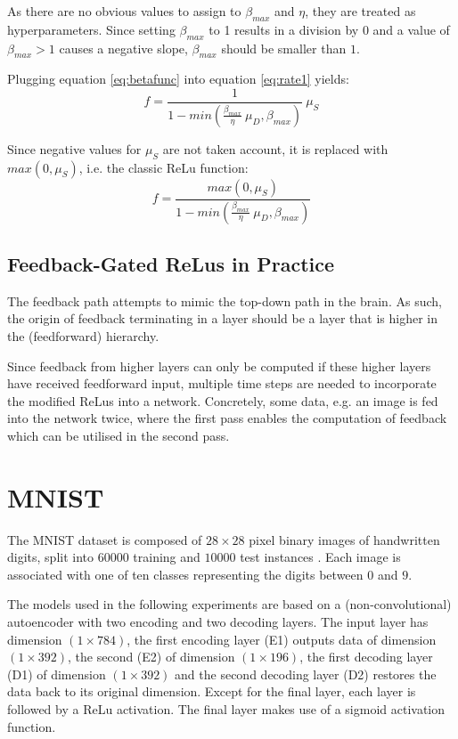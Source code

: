 \documentclass{article}
\begin{document}
As there are no obvious values to assign to $\beta_{max}$ and $\eta$, they are treated as hyperparameters. Since setting $\beta_{max}$ to 1 results in a division by $0$ and a value of $\beta_{max} > 1$ causes a negative slope, $\beta_{max}$ should be smaller than $1$. 

Plugging equation \ref{eq:betafunc} into equation \ref{eq:rate1} yields: 
\begin{equation}
	f = \frac{1}{1 - min(\frac{\beta_{max}}{\eta} \ \mu_D, \beta_{max})} \ \mu_S 
\end{equation}

Since negative values for $\mu_S$ are not taken account, it is replaced with $max(0, \mu_S)$, i.e. the classic ReLu function: 
\begin{equation}
		f = \frac{max(0, \mu_S)}{1 - min(\frac{\beta_{max}}{\eta} \ \mu_D, \beta_{max})} 
\end{equation}

\subsection{Feedback-Gated ReLus in Practice}
The feedback path attempts to mimic the top-down path in the brain. As such, the origin of feedback terminating in a layer should be a layer that is higher in the (feedforward) hierarchy. 

Since feedback from higher layers can only be computed if these higher layers have received feedforward input, multiple time steps are needed to incorporate the modified ReLus into a network. Concretely, some data, e.g. an image is fed into the network twice, where the first pass enables the computation of feedback which can be utilised in the second pass. 

\section{MNIST}
The MNIST dataset is composed of $28 \times 28$ pixel binary images of handwritten digits, split into $60000$ training and $10000$ test instances \cite{lecun2010mnist}. Each image is associated with one of ten classes representing the digits between $0$ and $9$. 

The models used in the following experiments are based on a (non-convolutional) autoencoder with two encoding and two decoding layers. The input layer has dimension $(1\times784)$, the first encoding layer (E1) outputs data of dimension $(1\times392)$, the second (E2) of dimension $(1\times196)$, the first decoding layer (D1) of dimension $(1\times392)$ and the second decoding layer (D2) restores the data back to its original dimension. Except for the final layer, each layer is followed by a ReLu activation. The final layer makes use of a sigmoid activation function. 
\end{document}
